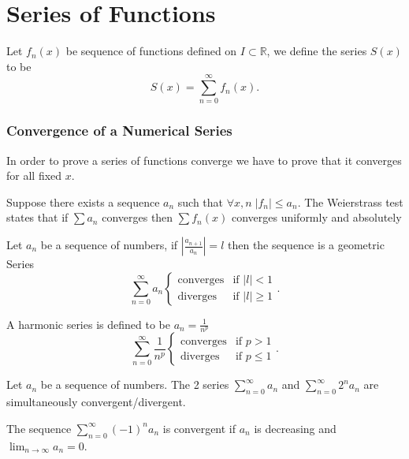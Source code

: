 \part{Series of Functions}

\begin{definition}
    Let $f_n(x)$ be sequence of functions defined on $I\subset\mathbb{R}$, we define the series $S(x)$ to be 
    \[
    S(x)=\sum_{n=0}^{\infty} f_n(x)
    .\] 
\end{definition}

\section{Convergence of a Numerical Series}
In order to prove a series of functions converge we have to prove that it converges for all fixed $x$.
\begin{theorem}
    Suppose there exists a sequence $a_n$ such that $\forall x,n \; |f_n|\le a_n$. The Weierstrass test states that if $\sum a_n$ converges then $\sum f_n(x)$ converges uniformly and absolutely
\end{theorem}

\begin{theorem}
    Let $a_n$ be a sequence of numbers, if $\left| \frac{a_{n+1}}{a_n} \right| =l$ then the sequence is a geometric Series
    \[
        \sum_{n=0}^\infty a_n \begin{cases} \text{converges}&\text{if } |l|<1\\
        \text{diverges}&\text{if }|l|\ge 1\end{cases} 
    .\] 
\end{theorem}

\begin{theorem}
    A harmonic series is defined to be $a_n=\frac{1}{n^p}$
    \[
        \sum_{n=0}^\infty \frac{1}{n^p} \begin{cases} \text{converges}&\text{if } p>1\\
        \text{diverges}&\text{if }p\le 1\end{cases} 
    .\] 

\end{theorem}


\begin{theorem}
    Let $a_n$ be a sequence of numbers. The 2 series $\sum_{n=0}^{\infty} a_n$ and $\sum_{n=0}^{\infty} 2^na_n$ are simultaneously convergent/divergent.
\end{theorem}


\begin{theorem}
    The sequence $\sum_{n=0}^{\infty} (-1)^na_n$ is convergent if $a_n$ is decreasing and $\lim_{n \to \infty}a_n =0$.
\end{theorem}

